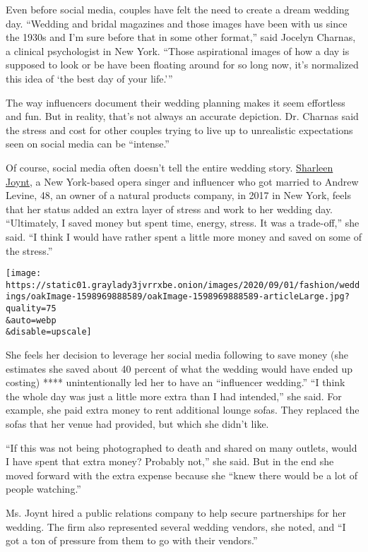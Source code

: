 Even before social media, couples have felt the need to create a dream
wedding day. ``Wedding and bridal magazines and those images have been
with us since the 1930s and I'm sure before that in some other format,''
said Jocelyn Charnas, a clinical psychologist in New York. ``Those
aspirational images of how a day is supposed to look or be have been
floating around for so long now, it's normalized this idea of `the best
day of your life.'''

The way influencers document their wedding planning makes it seem
effortless and fun. But in reality, that's not always an accurate
depiction. Dr. Charnas said the stress and cost for other couples trying
to live up to unrealistic expectations seen on social media can be
``intense.''

Of course, social media often doesn't tell the entire wedding story.
\href{https://www.instagram.com/sharleenjoynt/}{Sharleen Joynt}, a New
York-based opera singer and influencer who got married to Andrew Levine,
48, an owner of a natural products company, in 2017 in New York, feels
that her status added an extra layer of stress and work to her wedding
day. ``Ultimately, I saved money but spent time, energy, stress. It was
a trade-off,'' she said. ``I think I would have rather spent a little
more money and saved on some of the stress.''

\texttt{[image: https://static01.graylady3jvrrxbe.onion/images/2020/09/01/fashion/weddings/oakImage-1598969888589/oakImage-1598969888589-articleLarge.jpg?quality=75\\\&auto=webp\\\&disable=upscale]}

She feels her decision to leverage her social media following to save
money (she estimates she saved about 40 percent of what the wedding
would have ended up costing) **** unintentionally led her to have an
``influencer wedding.'' ``I think the whole day was just a little more
extra than I had intended,'' she said. For example, she paid extra money
to rent additional lounge sofas. They replaced the sofas that her venue
had provided, but which she didn't like.

``If this was not being photographed to death and shared on many
outlets, would I have spent that extra money? Probably not,'' she said.
But in the end she moved forward with the extra expense because she
``knew there would be a lot of people watching.''

Ms. Joynt hired a public relations company to help secure partnerships
for her wedding. The firm also represented several wedding vendors, she
noted, and ``I got a ton of pressure from them to go with their
vendors.''

